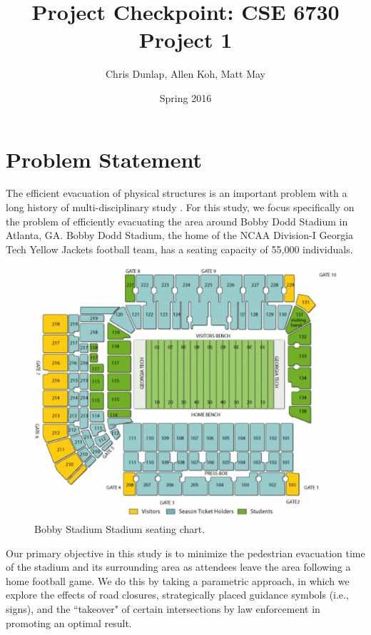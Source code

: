 \documentclass[12pt]{article}
\title{Project Checkpoint: CSE 6730 Project 1}
\author{Chris Dunlap, Allen Koh, Matt May}
\date{Spring 2016}
\begin{document}
\begin{titlepage}
  \maketitle
  \thispagestyle{empty}
\end{titlepage}

\newpage
  \tableofcontents
  \thispagestyle{empty}
\newpage

\section{Problem Statement}
\label{sec:problem}

The efficient evacuation of physical structures is an important problem with a
long history of multi-disciplinary study \cite{zheng2009modeling}. For this
study, we focus specifically on the problem of efficiently evacuating the
area around Bobby Dodd Stadium in Atlanta, GA. Bobby Dodd Stadium, the home of
the NCAA Division-I Georgia Tech Yellow Jackets football team, has a
seating capacity of 55,000 individuals.

\begin{figure}[H]
  \includegraphics[width=\linewidth,natwidth=521,natheight=435]{stadium_diagram_updated.png}
  \caption{Bobby Stadium Stadium seating chart.}
  \label{fig:polygon}
\end{figure}

Our primary objective in this study is to minimize the pedestrian evacuation
time of the stadium and its surrounding area as attendees leave the area
following a home football game. We do this by taking a parametric approach, in
which we explore the effects of road closures, strategically placed guidance
symbols (i.e., signs), and the ``takeover" of certain intersections by law
enforcement in promoting an optimal result.
\end{document}
